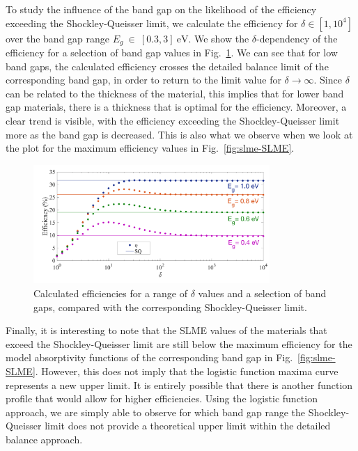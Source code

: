\begin{refsection}
To study the influence of the band gap on the likelihood of the efficiency exceeding the Shockley-Queisser limit, we calculate the efficiency for $\delta \in [1, 10^4]$ over the band gap range $E_g~\in~[0.3, 3]~\si{\electronvolt}$. We show the $\delta$-dependency of the efficiency for a selection of band gap values in Fig.~\ref{fig:slme-deltadep}. We can see that for low band gaps, the calculated efficiency crosses the detailed balance limit of the corresponding band gap, in order to return to the limit value for $\delta \rightarrow \infty$. Since $\delta$ can be related to the thickness of the material, this implies that for lower band gap materials, there is a thickness that is optimal for the efficiency. Moreover, a clear trend is visible, with the efficiency exceeding the Shockley-Queisser limit more as the band gap is decreased. This is also what we observe when we look at the plot for the maximum efficiency values in Fig.~\ref{fig:slme-SLME}.

\begin{figure}[h!]
\centering
\includegraphics[width=0.8\textwidth]{Figures/slme/sq_Fig3.png}
\caption{Calculated efficiencies for a range of $\delta$ values and a selection of band gaps, compared with the corresponding Shockley-Queisser limit.}
\label{fig:slme-deltadep}
\end{figure}

Finally, it is interesting to note that the SLME values of the materials that exceed the Shockley-Queisser limit are still below the maximum efficiency for the model absorptivity functions of the corresponding band gap in Fig.~\ref{fig:slme-SLME}. However, this does not imply that the logistic function maxima curve represents a new upper limit. It is entirely possible that there is another function profile that would allow for higher efficiencies. Using the logistic function approach, we are simply able to observe for which band gap range the Shockley-Queisser limit does not provide a theoretical upper limit within the detailed balance approach.


\end{refsection}
